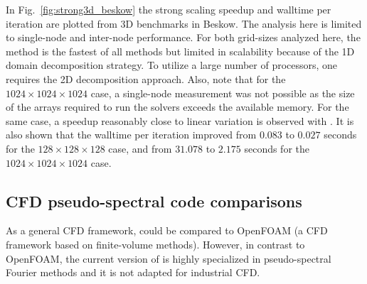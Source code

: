 In Fig.~\ref{fig:strong3d_beskow} the strong scaling speedup and walltime per
iteration are plotted from 3D benchmarks in Beskow.
%
The analysis here is limited to single-node and inter-node performance.
%
For both grid-sizes analyzed here, the 
method is the fastest of all methods but limited in scalability because of the
1D domain decomposition strategy.  To utilize a large number of processors, one
requires the 2D decomposition approach. Also, note that for the
$1024\times1024\times1024$ case, a single-node measurement was not possible as
the size of the arrays required to run the solvers exceeds the available
memory. For the same case, a speedup reasonably close to linear variation is
observed with .
%
It is also shown that the walltime per iteration improved from
%
$0.083$ to $0.027$ seconds for the $128\times128\times128$ case, and from
$31.078$ to $2.175$ seconds for the $1024\times1024\times1024$ case.



\subsection{CFD pseudo-spectral code comparisons}



As a general CFD framework,  could be compared to OpenFOAM (a CFD
framework based on finite-volume methods).
%
However, in contrast to OpenFOAM, the current version of  is highly
specialized in pseudo-spectral Fourier methods and it is not adapted for
industrial CFD.

